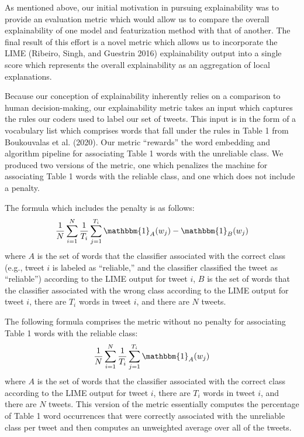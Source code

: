 \documentclass{article}
\begin{document}
As mentioned above, our initial motivation in pursuing explainability
was to provide an evaluation metric which would allow us to compare the
overall explainability of one model and featurization method with that
of another. The final result of this effort is a novel metric which
allows us to incorporate the LIME (Ribeiro, Singh, and Guestrin 2016)
explainability output into a single score which represents the overall
explainability as an aggregation of local explanations.

Because our conception of explainability inherently relies on a
comparison to human decision-making, our explainability metric takes an
input which captures the rules our coders used to label our set of
tweets. This input is in the form of a vocabulary list which comprises
words that fall under the rules in Table 1 from Boukouvalas et al.
(2020). Our metric ``rewards'' the word embedding and algorithm pipeline
for associating Table 1 words with the unreliable class. We produced two
versions of the metric, one which penalizes the machine for associating
Table 1 words with the reliable class, and one which does not include a
penalty.

The formula which includes the penalty is as follows:
\[\frac{1}{N} \sum_{i=1}^{N} \frac{1}{T_i} \sum_{j=1}^{T_i} \mathbbm{1}_A(w_j) - \mathbbm{1}_B(w_j)\]
where \(A\) is the set of words that the classifier associated with the
correct class (e.g., tweet \(i\) is labeled as ``reliable,'' and the
classifier classified the tweet as ``reliable'') according to the LIME
output for tweet \(i\), \(B\) is the set of words that the classifier
associated with the wrong class according to the LIME output for tweet
\(i\), there are \(T_i\) words in tweet \(i\), and there are \(N\)
tweets.

The following formula comprises the metric without no penalty for
associating Table 1 words with the reliable class:
\[\frac{1}{N} \sum_{i=1}^{N} \frac{1}{T_i} \sum_{j=1}^{T_i} \mathbbm{1}_A(w_j)\]
where \(A\) is the set of words that the classifier associated with the
correct class according to the LIME output for tweet \(i\), there are
\(T_i\) words in tweet \(i\), and there are \(N\) tweets. This version
of the metric essentially computes the percentage of Table 1 word
occurrences that were correctly associated with the unreliable class per
tweet and then computes an unweighted average over all of the tweets.
\end{document}
